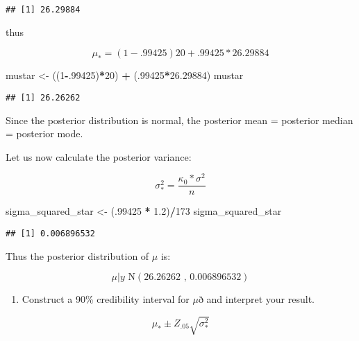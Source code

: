 \documentclass[]{article}
\newenvironment{Shaded}{\begin{snugshade}}{\end{snugshade}}
\newcommand{\DecValTok}[1]{\textcolor[rgb]{0.00,0.00,0.81}{#1}}
\newcommand{\FloatTok}[1]{\textcolor[rgb]{0.00,0.00,0.81}{#1}}
\newcommand{\StringTok}[1]{\textcolor[rgb]{0.31,0.60,0.02}{#1}}
\newcommand{\OperatorTok}[1]{\textcolor[rgb]{0.81,0.36,0.00}{\textbf{#1}}}
\newcommand{\NormalTok}[1]{#1}
\providecommand{\tightlist}{%
  \setlength{\itemsep}{0pt}\setlength{\parskip}{0pt}}
\begin{document}
\begin{verbatim}
## [1] 26.29884
\end{verbatim}

thus

\[ \mu_* = (1-.99425)20 + .99425*26.29884 \]

\begin{Shaded}
\begin{Highlighting}[]
\NormalTok{mustar <-}\StringTok{ }\NormalTok{((}\DecValTok{1}\OperatorTok{-}\NormalTok{.}\DecValTok{99425}\NormalTok{)}\OperatorTok{*}\DecValTok{20}\NormalTok{) }\OperatorTok{+}\StringTok{ }\NormalTok{(.}\DecValTok{99425}\OperatorTok{*}\FloatTok{26.29884}\NormalTok{)}
\NormalTok{mustar}
\end{Highlighting}
\end{Shaded}

\begin{verbatim}
## [1] 26.26262
\end{verbatim}

Since the posterior distribution is normal, the posterior mean =
posterior median = posterior mode.

Let us now calculate the posterior variance:

\[ \sigma^2_* = \frac{\kappa_0 * \sigma^2}{n} \]

\begin{Shaded}
\begin{Highlighting}[]
\NormalTok{sigma_squared_star <-}\StringTok{ }\NormalTok{(.}\DecValTok{99425} \OperatorTok{*}\StringTok{ }\FloatTok{1.2}\NormalTok{)}\OperatorTok{/}\DecValTok{173}
\NormalTok{sigma_squared_star}
\end{Highlighting}
\end{Shaded}

\begin{verbatim}
## [1] 0.006896532
\end{verbatim}

Thus the posterior distribution of \(\mu\) is:

\[\mu|y \text{~} \text{N} (26.26262 \text{ , } 0.006896532)\]

\begin{enumerate}
\def\labelenumi{\alph{enumi})}
\setcounter{enumi}{1}
\tightlist
\item
  Construct a 90\% credibility interval for \(\mu\)ð and interpret
  your result.
\end{enumerate}

\[\mu_* \pm Z_.05 \sqrt{\sigma^2_*} \]
\end{document}
